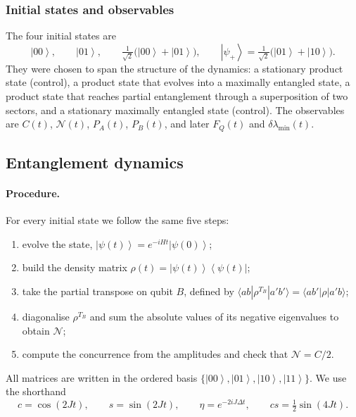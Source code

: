 \documentclass[11pt,a4paper]{article}
\newcommand{\ket}[1]{\left|#1\right\rangle}
\newcommand{\bra}[1]{\left\langle #1\right|}
\newcommand{\FQ}{F_Q}
\begin{document}
\subsubsection{Initial states and observables}
The four initial states are
\begin{equation}
  \ket{00},\qquad \ket{01},\qquad \tfrac{1}{\sqrt2}\bigl(\ket{00}+\ket{01}\bigr),\qquad \ket{\psi_+}=\tfrac{1}{\sqrt2}\bigl(\ket{01}+\ket{10}\bigr).
\end{equation}
They were chosen to span the structure of the dynamics: a stationary product state (control), a product state that evolves into a maximally entangled state, a product state that reaches partial entanglement through a superposition of two sectors, and a stationary maximally entangled state (control). The observables are $C(t)$, $\mathcal N(t)$, $P_A(t)$, $P_B(t)$, and later $\FQ(t)$ and $\delta\lambda_{\min}(t)$.

\subsection{Entanglement dynamics}

\paragraph{Procedure.}
For every initial state we follow the same five steps:
\begin{enumerate}
  \item evolve the state, $\ket{\psi(t)}=e^{-iHt}\ket{\psi(0)}$;
  \item build the density matrix $\rho(t)=\ket{\psi(t)}\!\bra{\psi(t)}$;
  \item take the partial transpose on qubit $B$, defined by $\langle ab|\rho^{T_B}|a'b'\rangle=\langle ab'|\rho|a'b\rangle$;
  \item diagonalise $\rho^{T_B}$ and sum the absolute values of its negative eigenvalues to obtain $\mathcal N$;
  \item compute the concurrence from the amplitudes and check that $\mathcal N=C/2$.
\end{enumerate}
All matrices are written in the ordered basis $\{\ket{00},\ket{01},\ket{10},\ket{11}\}$. We use the shorthand
\begin{equation}
  c=\cos(2Jt),\qquad s=\sin(2Jt),\qquad \eta=e^{-2iJ\Delta t},\qquad cs=\tfrac12\sin(4Jt).
\end{equation}
\end{document}
